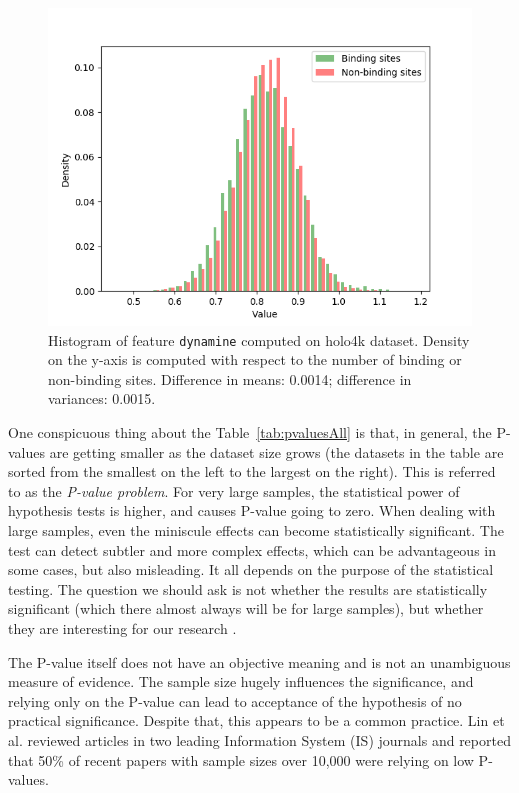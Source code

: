 \begin{figure}[!htbp]
\centering
\includegraphics[width=120mm]{../img/dynamine_hist.png}
\caption{Histogram of feature \texttt{dynamine} computed on holo4k dataset. Density on the y-axis is computed with respect to the number of binding or non-binding sites. Difference in means: 0.0014; difference in variances: 0.0015.}
\label{fig:dynamine}
\end{figure}

One conspicuous thing about the Table~\ref{tab:pvaluesAll} is that, in general, the P-values are getting smaller as the dataset size grows (the datasets in the table are sorted from the smallest on the left to the largest on the right). This is referred to as the \textit{P-value problem}. For very large samples, the statistical power of hypothesis tests is higher, and causes P-value going to zero. When dealing with large samples, even the miniscule effects can become statistically significant. The test can detect subtler and more complex effects, which can be advantageous in some cases, but also misleading. It all depends on the purpose of the statistical testing. The question we should ask is not whether the results are statistically significant (which there almost always will be for large samples), but whether they are interesting for our research \cite{pvalueproblem}.

The P-value itself does not have an objective meaning and is not an unambiguous measure of evidence. The sample size hugely influences the significance, and relying only on the P-value can lead to acceptance of the hypothesis of no practical significance. Despite that, this appears to be a common practice. Lin et al. \cite{pvalueproblem} reviewed articles in two leading Information System (IS) journals and reported that 50\% of recent papers with sample sizes over 10,000 were relying on low P-values.

